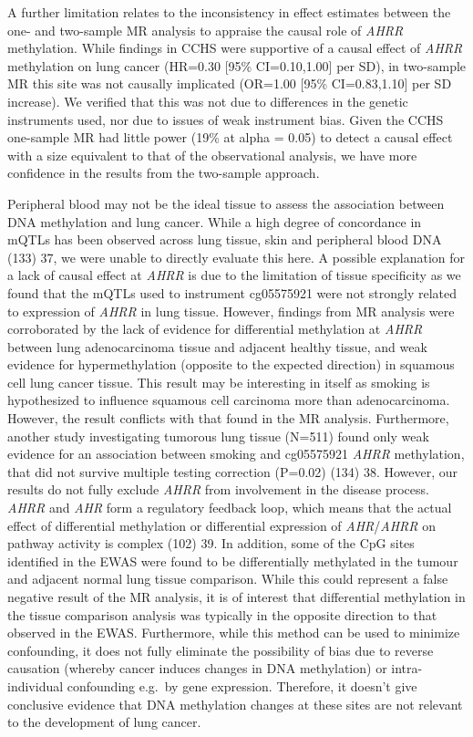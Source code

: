 \documentclass[11pt,twoside]{bristolthesis}
\begin{document}
A further limitation relates to the inconsistency in effect estimates between the one- and two-sample MR analysis to appraise the causal role of \emph{AHRR} methylation. While findings in CCHS were supportive of a causal effect of \emph{AHRR} methylation on lung cancer (HR=0.30 {[}95\% CI=0.10,1.00{]} per SD), in two-sample MR this site was not causally implicated (OR=1.00 {[}95\% CI=0.83,1.10{]} per SD increase). We verified that this was not due to differences in the genetic instruments used, nor due to issues of weak instrument bias. Given the CCHS one-sample MR had little power (19\% at alpha = 0.05) to detect a causal effect with a size equivalent to that of the observational analysis, we have more confidence in the results from the two-sample approach.

Peripheral blood may not be the ideal tissue to assess the association between DNA methylation and lung cancer. While a high degree of concordance in mQTLs has been observed across lung tissue, skin and peripheral blood DNA (133) 37, we were unable to directly evaluate this here. A possible explanation for a lack of causal effect at \emph{AHRR} is due to the limitation of tissue specificity as we found that the mQTLs used to instrument cg05575921 were not strongly related to expression of \emph{AHRR} in lung tissue. However, findings from MR analysis were corroborated by the lack of evidence for differential methylation at \emph{AHRR} between lung adenocarcinoma tissue and adjacent healthy tissue, and weak evidence for hypermethylation (opposite to the expected direction) in squamous cell lung cancer tissue. This result may be interesting in itself as smoking is hypothesized to influence squamous cell carcinoma more than adenocarcinoma. However, the result conflicts with that found in the MR analysis. Furthermore, another study investigating tumorous lung tissue (N=511) found only weak evidence for an association between smoking and cg05575921 \emph{AHRR} methylation, that did not survive multiple testing correction (P=0.02) (134) 38. However, our results do not fully exclude \emph{AHRR} from involvement in the disease process. \emph{AHRR} and \emph{AHR} form a regulatory feedback loop, which means that the actual effect of differential methylation or differential expression of \emph{AHR}/\emph{AHRR} on pathway activity is complex (102) 39. In addition, some of the CpG sites identified in the EWAS were found to be differentially methylated in the tumour and adjacent normal lung tissue comparison. While this could represent a false negative result of the MR analysis, it is of interest that differential methylation in the tissue comparison analysis was typically in the opposite direction to that observed in the EWAS. Furthermore, while this method can be used to minimize confounding, it does not fully eliminate the possibility of bias due to reverse causation (whereby cancer induces changes in DNA methylation) or intra-individual confounding e.g.~by gene expression. Therefore, it doesn't give conclusive evidence that DNA methylation changes at these sites are not relevant to the development of lung cancer.
\end{document}
